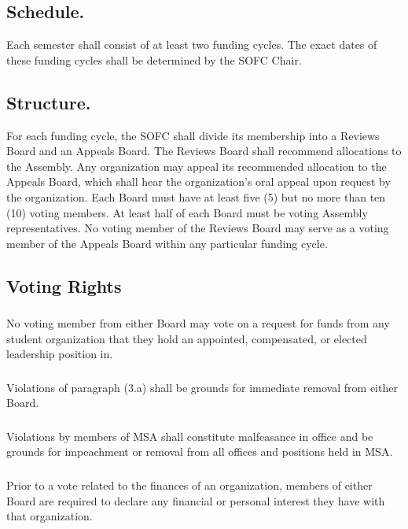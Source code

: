 \subsection{Schedule.}
Each semester shall consist of at least two funding cycles.  The exact dates of these funding cycles shall be determined by the SOFC Chair.

\subsection{Structure.}
For each funding cycle, the SOFC shall divide its membership into a Reviews Board and an Appeals Board.  The Reviews Board shall recommend allocations to the Assembly.  Any organization may appeal its recommended allocation to the Appeals Board, which shall hear the organization's oral appeal upon request by the organization.  Each Board must have at least five (5) but no more than ten (10) voting members.  At least half of each Board must be voting Assembly representatives.  No voting member of the Reviews Board may serve as a voting member of the Appeals Board within any particular funding cycle.

\subsection{Voting Rights}
\subsubsection{}
No voting member from either Board may vote on a request for funds from any student organization that they hold an appointed, compensated, or elected leadership position in.
\subsubsection{}
Violations of paragraph (3.a) shall be grounds for immediate removal from either Board.
\subsubsection{}
Violations by members of MSA shall constitute malfeasance in office and be grounds for impeachment or removal from all offices and positions held in MSA.
\subsubsection{}
Prior to a vote related to the finances of an organization, members of either Board are required to declare any financial or personal interest they have with that organization.
